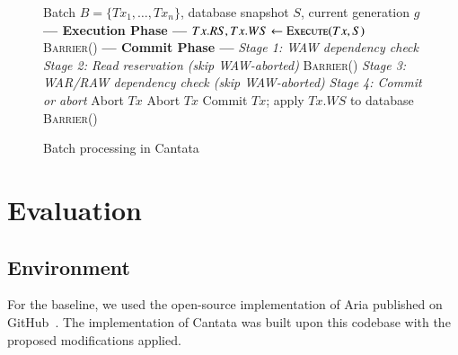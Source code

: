 \documentclass[english,preprint,JIP]{ipsj}
\begin{document}
\begin{figure}[!t]
\begin{algorithm}[H]
    \caption{Batch processing in Cantata}
    \label{alg3}
    \begin{algorithmic}[1]
    \Require Batch $B = \{Tx_1, \ldots, Tx_n\}$, database snapshot $S$, current generation $g$
    \Statex \textbf{--- Execution Phase ---}
        \State $Tx.RS, Tx.WS \gets \textsc{Execute}(Tx, S)$
        \State {}
    \EndFor
    \State \textsc{Barrier}()
    \Statex
    \Statex \textbf{--- Commit Phase ---}
    \Statex \textit{Stage 1: WAW dependency check}
        \State {}
    \EndFor
    \Statex
    \Statex \textit{Stage 2: Read reservation (skip WAW-aborted)}
            \State {}
        \EndIf
    \EndFor
    \State \textsc{Barrier}()
    \Statex
    \Statex \textit{Stage 3: WAR/RAW dependency check (skip WAW-aborted)}
            \State {}
            \State {}
        \EndIf
    \EndFor
    \Statex
    \Statex \textit{Stage 4: Commit or abort}
            \State Abort $Tx$
            \State Abort $Tx$
        \Else
            \State Commit $Tx$; apply $Tx.WS$ to database
        \EndIf
    \EndFor
    \State \textsc{Barrier}()
    \end{algorithmic}
\end{algorithm}
\end{figure}


\section{Evaluation}
\subsection{Environment}
For the baseline, we used the open-source implementation of Aria published on GitHub~\cite{lu2020aria_github}. The implementation of Cantata was built upon this codebase with the proposed modifications applied.
\end{document}
